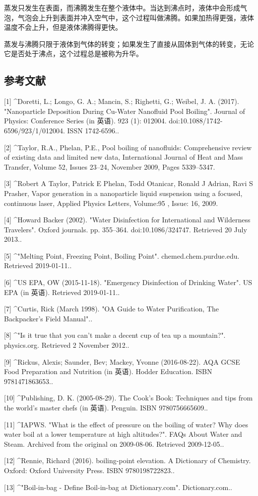 蒸发只发生在表面，而沸腾发生在整个液体中。当达到沸点时，液体中会形成气泡，气泡会上升到表面并冲入空气中，这个过程叫做沸腾。如果加热得更强，液体温度不会上升，但是液体沸腾得更快。

蒸发与沸腾只限于液体到气体的转变；如果发生了直接从固体到气体的转变，无论它是否处于沸点，这个过程总是被称为升华。

\subsection{参考文献}
[1]
^Doretti, L.; Longo, G. A.; Mancin, S.; Righetti, G.; Weibel, J. A. (2017). "Nanoparticle Deposition During Cu-Water Nanofluid Pool Boiling". Journal of Physics: Conference Series (in 英语). 923 (1): 012004. doi:10.1088/1742-6596/923/1/012004. ISSN 1742-6596..

[2]
^Taylor, R.A., Phelan, P.E., Pool boiling of nanofluids: Comprehensive review of existing data and limited new data, International Journal of Heat and Mass Transfer, Volume 52, Issues 23–24, November 2009, Pages 5339–5347.

[3]
^Robert A Taylor, Patrick E Phelan, Todd Otanicar, Ronald J Adrian, Ravi S Prasher, Vapor generation in a nanoparticle liquid suspension using a focused, continuous laser, Applied Physics Letters, Volume:95 , Issue: 16, 2009.

[4]
^Howard Backer (2002). "Water Disinfection for International and Wilderness Travelers". Oxford journals. pp. 355–364. doi:10.1086/324747. Retrieved 20 July 2013..

[5]
^"Melting Point, Freezing Point, Boiling Point". chemed.chem.purdue.edu. Retrieved 2019-01-11..

[6]
^US EPA, OW (2015-11-18). "Emergency Disinfection of Drinking Water". US EPA (in 英语). Retrieved 2019-01-11..

[7]
^Curtis, Rick (March 1998). "OA Guide to Water Purification, The Backpacker's Field Manual"..

[8]
^"Is it true that you can't make a decent cup of tea up a mountain?". physics.org. Retrieved 2 November 2012..

[9]
^Rickus, Alexis; Saunder, Bev; Mackey, Yvonne (2016-08-22). AQA GCSE Food Preparation and Nutrition (in 英语). Hodder Education. ISBN 9781471863653..

[10]
^Publishing, D. K. (2005-08-29). The Cook's Book: Techniques and tips from the world's master chefs (in 英语). Penguin. ISBN 9780756665609..

[11]
^IAPWS. "What is the effect of pressure on the boiling of water? Why does water boil at a lower temperature at high altitudes?". FAQs About Water and Steam. Archived from the original on 2009-08-06. Retrieved 2009-12-05..

[12]
^Rennie, Richard (2016). boiling-point elevation. A Dictionary of Chemistry. Oxford: Oxford University Press. ISBN 9780198722823..

[13]
^"Boil-in-bag - Define Boil-in-bag at Dictionary.com". Dictionary.com..